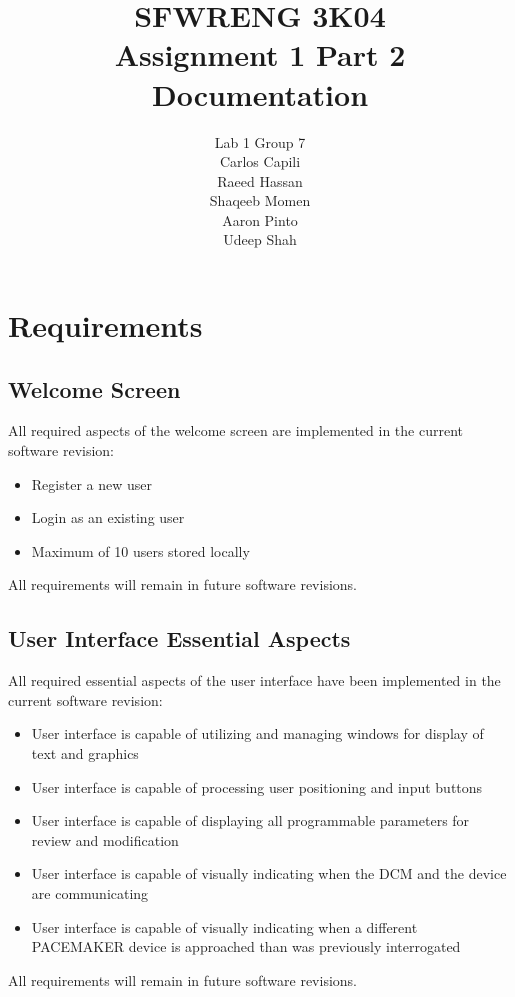 \documentclass[12pt]{article}
\title{SFWRENG 3K04 \\ Assignment 1 Part 2 \\ Documentation}
\author{
    Lab 1 Group 7 \\
    Carlos Capili \\
    Raeed Hassan \\
    Shaqeeb Momen \\
    Aaron Pinto \\
    Udeep Shah
}
\date{}
\begin{document}
\maketitle \newpage
\tableofcontents \newpage

\section{Requirements}

\subsection{Welcome Screen}
All required aspects of the welcome screen are implemented in the current software revision:
\begin{itemize}
    \item Register a new user
    \item Login as an existing user
    \item Maximum of 10 users stored locally
\end{itemize}
All requirements will remain in future software revisions.

\subsection{User Interface Essential Aspects}
All required essential aspects of the user interface have been implemented in the current software revision:
\begin{itemize}
    \item User interface is capable of utilizing and managing windows for display of text and graphics
    \item User interface is capable of processing user positioning and input buttons
    \item User interface is capable of displaying all programmable parameters for review and modification
    \item User interface is capable of visually indicating when the DCM and the device are communicating
    \item User interface is capable of visually indicating when a different PACEMAKER device is approached than was previously interrogated
\end{itemize}
All requirements will remain in future software revisions.
\end{document}
